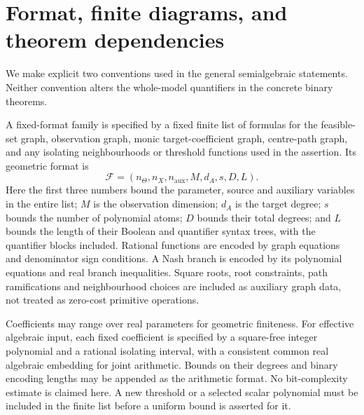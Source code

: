 \section{Format, finite diagrams, and theorem dependencies}\label{app:v101-format}
We make explicit two conventions used in the general semialgebraic
statements. Neither convention alters the whole-model quantifiers in
the concrete binary theorems.

\begin{definition}\label{def:v101-format}
A fixed-format family is specified by a fixed finite list of formulas
for the feasible-set graph, observation graph, monic target-coefficient
graph, centre-path graph, and any isolating neighbourhoods or threshold
functions used in the assertion. Its geometric format is
\[
 \mathcal F=(n_\Theta,n_X,n_{\mathrm{aux}},M,d_A,s,D,L).
\]
Here the first three numbers bound the parameter, source and auxiliary
variables in the entire list; $M$ is the observation dimension; $d_A$
is the target degree; $s$ bounds the number of polynomial atoms;
$D$ bounds their total degrees; and $L$ bounds the length of their
Boolean and quantifier syntax trees, with the quantifier blocks included.
Rational functions are encoded by graph equations and denominator sign
conditions. A Nash branch is encoded by its polynomial equations and
real branch inequalities. Square roots, root constraints, path
ramifications and neighbourhood choices are included as auxiliary
graph data, not treated as zero-cost primitive operations.

Coefficients may range over real parameters for geometric finiteness.
For effective algebraic input, each fixed coefficient is specified by
a square-free integer polynomial and a rational isolating interval,
with a consistent common real algebraic embedding for joint arithmetic.
Bounds on their degrees and binary encoding lengths may be appended
as the arithmetic format. No bit-complexity estimate is claimed here.
A new threshold or a selected scalar polynomial must be included in
the finite list before a uniform bound is asserted for it.
\end{definition}

